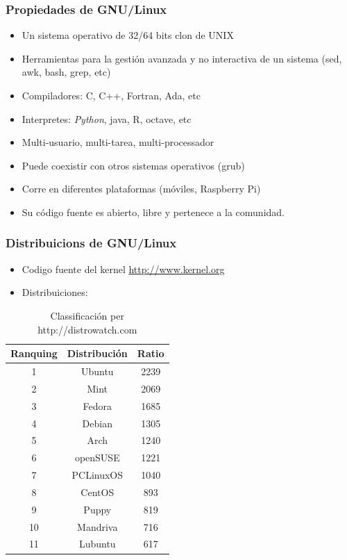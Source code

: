 \documentclass[colorlinks,10pt]{beamer}
\begin{document}
\begin{frame}
  \frametitle{Propiedades de GNU/Linux} 
  
  \begin{itemize}
  \item<+-> Un sistema operativo de 32/64 bits clon de UNIX
  \item<+-> Herramientas para la gestión avanzada y no interactiva de un sistema  (sed, awk, bash, grep, etc)
    
  
  \item<+-> Compiladores: C, C++, Fortran, Ada, etc
  \item<+-> Interpretes: \emph{Python}, java, R, octave, etc
  

  \item<+->  Multi-usuario, multi-tarea, multi-processador
  \item<+->  Puede coexistir con otros sistemas  operativos (grub)
  \item<+->  Corre en diferentes plataformas (móviles, Raspberry Pi)
  \item<+->  Su código fuente es abierto, libre y pertenece a la comunidad. 
  \end{itemize}
  
\end{frame}



\begin{frame}
  \frametitle{Distribuicions de GNU/Linux} 
  
  \begin{itemize}
  \item Codigo fuente del kernel \href{http://www.kernel.org}{http://www.kernel.org}
  \item Distribuiciones:
  \end{itemize}
  \begin{table}
    \centering
    \begin{tabular}{|c|c|c|}\hline 
      Ranquing& Distribución & Ratio\\ \hline 
      1& 	Ubuntu& 	2239\\
      2& 	Mint& 	2069\\
      3& 	Fedora& 	1685\\
      4& 	Debian& 	1305\\
      5& 	Arch& 	1240\\
      6& 	openSUSE& 	1221\\
      7& 	PCLinuxOS& 	1040\\
      8& 	CentOS& 	893\\
      9& 	Puppy& 	819\\
      10& 	Mandriva& 	716\\
      11& 	Lubuntu& 	617\\ \hline 
    \end{tabular}
    \caption{Classificación per http://distrowatch.com}
  \end{table}
\end{frame}
\end{document}
